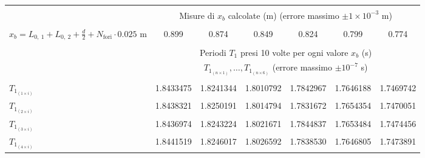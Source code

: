 \begin{table*}[t!]
    \centering
    \caption{}
    \footnotesize
    \label{table:raw_data}
    \begin{tabular}{l*{6}{c}}
        \hline\hline\\[-1.5ex]
                                                                              & \multicolumn{6}{c}{Misure di $x_b$ calcolate (m) (errore massimo $\pm1\times10^{-3}$ m)}                 \\[+0.5ex] \hline \\[-1.5ex]
        $x_b=L_{0,~1} + L_{0,~2} + \frac{d}{2} + N_{\text{fori}}\cdot0.025$ m & 0.899     & 0.874              & 0.849              & 0.824     & 0.799     & 0.774                      \\[+0.5ex] \hline \\[-1.5ex]
                                                                              & \multicolumn{6}{c}{Periodi $T_1$ presi 10 volte per ogni valore $x_b$ (s)}                               \\[+0.5ex]
                                                                              & \multicolumn{6}{c}{$T_{1_{(n \times 1)}}, \ldots, T_{1_{(n \times 6)}}$ (errore massimo $\pm10^{-7}$ s)} \\[+0.5ex] \hline \\[-1.5ex]
        $T_{1_{(1 \times i)}}$                                                & 1.8433475 & 1.8241344          & 1.8010792          & 1.7842967 & 1.7646188 & 1.7469742                  \\[+0.5ex]
        $T_{1_{(2 \times i)}}$                                                & 1.8438321 & 1.8250191          & 1.8014794          & 1.7831672 & 1.7654354 & 1.7470051                  \\[+0.5ex]
        $T_{1_{(3 \times i)}}$                                                & 1.8436974 & 1.8243224          & 1.8021671          & 1.7844837 & 1.7653484 & 1.7474456                  \\[+0.5ex]
        $T_{1_{(4 \times i)}}$                                                & 1.8441519 & 1.8246017          & 1.8026592          & 1.7838530 & 1.7646805 & 1.7473891                  \\[+0.5ex]

\end{tabular}
\end{table*}
